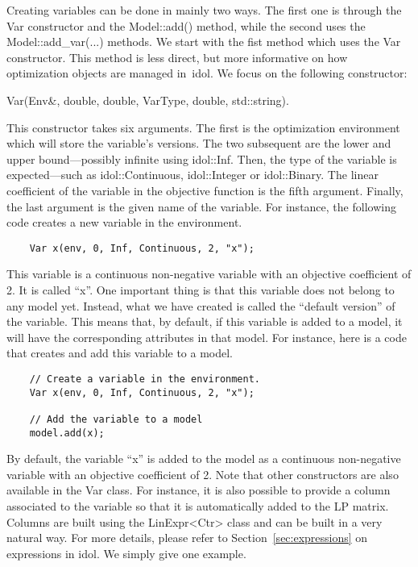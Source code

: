 Creating variables can be done in mainly two ways. The first one is through
the \textsf{Var} constructor and the \textsf{Model::add()} method, while the
second uses the \textsf{Model::add\_var(...)} methods. We start with the fist
method which uses the \textsf{Var} constructor. This method is less direct,
but more informative on how optimization objects are managed in~\textsf{idol}.
We focus on the following constructor:
\begin{center}
    \textsf{Var(Env\&, double, double, VarType, double, std::string)}.
\end{center}
This constructor takes six arguments. The first is the optimization
environment which will store the variable's versions. The two subsequent are
the lower and upper bound---possibly infinite using \textsf{idol::Inf}.
Then, the type of the variable is expected---such as
\textsf{idol::Continuous}, \textsf{idol::Integer} or \textsf{idol::Binary}.
The linear coefficient of the variable in the objective function is the fifth
argument. Finally, the last argument is the given name of the variable. For
instance, the following code creates a new variable in the environment.

\begin{lstlisting}
    Var x(env, 0, Inf, Continuous, 2, "x");
\end{lstlisting}
This variable is a continuous non-negative variable with an objective
coefficient of 2. It is called ``\textsf{x}''. One important thing is that
this variable does not belong to any model yet. Instead, what we have created
is called the ``default version'' of the variable. This means that, by
default, if this variable is added to a model, it will have the corresponding
attributes in that model. For instance, here is a code that creates and add
this variable to a model.

\begin{lstlisting}
    // Create a variable in the environment.
    Var x(env, 0, Inf, Continuous, 2, "x");

    // Add the variable to a model 
    model.add(x);
\end{lstlisting}

By default, the variable ``\textsf{x}'' is added to the model as a continuous
non-negative variable with an objective coefficient of 2. Note that other
constructors are also available in the \textsf{Var} class. For instance, it is
also possible to provide a column associated to the variable so that it is
automatically added to the LP matrix. Columns are built using the
\textsf{LinExpr<Ctr>} class and can be built in a very natural way. For more
details, please refer to Section~\ref{sec:expressions} on expressions in
\textsf{idol}. We simply give one example. 

